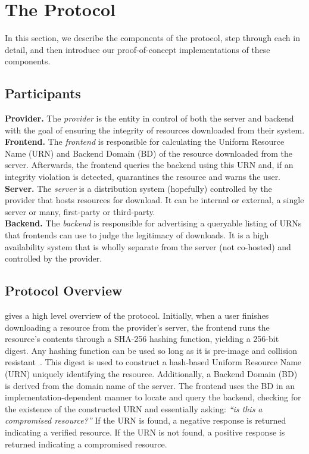 \section{The \SYSTEM{} Protocol} \label{sec:approach}

In this section, we describe the components of the \SYSTEM{} protocol, step
through each in detail, and then introduce our proof-of-concept implementations
of these components.

\subsection{Participants}

\noindent\textbf{Provider.} The \emph{provider} is the entity in control of both
the server and backend with the goal of ensuring the integrity of resources
downloaded from their system. \\

\noindent\textbf{\SYSTEM{} Frontend.} The \emph{frontend} is responsible for
calculating the Uniform Resource Name (URN) and Backend Domain (BD) of the
resource downloaded from the server. Afterwards, the frontend queries the
backend using this URN and, if an integrity violation is detected, quarantines
the resource and warns the user. \\

\noindent\textbf{Server.} The \emph{server} is a distribution system (hopefully)
controlled by the provider that hosts resources for download. It can be internal
or external, a single server or many, first-party or third-party. \\

\noindent\textbf{\SYSTEM{} Backend.} The \emph{backend} is responsible for
advertising a queryable listing of URNs that \SYSTEM{} frontends can use to
judge the legitimacy of downloads. It is a high availability system that is
wholly separate from the server (not co-hosted) and controlled by the provider.

\subsection{Protocol Overview}


 gives a high level overview of the \SYSTEM{} protocol.
Initially, when a user finishes downloading a resource from the provider's
server, the frontend runs the resource's contents through a SHA-256 hashing
function, yielding a 256-bit digest. Any hashing function can be used so long as
it is pre-image and collision resistant~\cite{Rogaway}. This digest is used to
construct a hash-based Uniform Resource Name (URN) uniquely identifying the
resource. Additionally, a Backend Domain (BD) is derived from the domain name of
the server. The frontend uses the BD in an implementation-dependent manner to
locate and query the backend, checking for the existence of the constructed URN
and essentially asking: \emph{``is this a compromised resource?''} If the URN is
found, a negative response is returned indicating a verified resource. If the
URN is not found, a positive response is returned indicating a compromised
resource.

